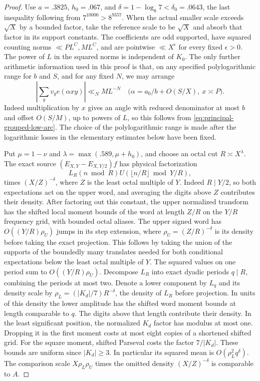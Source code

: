 \documentclass[11pt,a4paper]{article}
\theoremstyle{paperplain}
\numberwithin{equation}{section}
\begin{document}
\begin{proof}
Use $a=.3825$, $h_0=.067$, and $\delta=1-\log_8 7<\delta_0=.0643$,
the last inequality following from $7^{10000}>8^{9357}$.
When the actual smaller scale exceeds $\sqrt X$ by a bounded factor,
take the reference scale to be $\sqrt X$ and absorb that factor in its
support constants. The coefficients are odd supported, have squared
counting norms $\ll PL^C,ML^C$, and are pointwise $\ll X^\epsilon$ for
every fixed $\epsilon>0$. The power of $L$ in the squared norms is
independent of $K_0$. The only further arithmetic information used in
this proof is that, on any specified polylogarithmic range for $b$ and
$S$, and for any fixed $N$, we may arrange
\begin{equation}\label{eq:near-balanced-small-model-arc}
    \left|\sum_y v_y e(\alpha xy)\right|\ll_N M L^{-N}
   \quad\bigl(\alpha=a_0/b+O(S/X),\ x\asymp P\bigr).
\end{equation}
Indeed multiplication by $x$ gives an angle with reduced denominator
at most $b$ and offset $O(S/M)$, up to powers of $L$, so this follows
from \eqref{eq:principal-grouped-low-arc}. The choice of the
polylogarithmic range is made after the logarithmic losses in the
elementary estimates below have been fixed.

Put $\mu=1-\nu$ and $\lambda=\max(.589,\mu+h_0)$, and choose
an octal cut $R\asymp X^\lambda$. The exact source
$(E_{X,Y}-E_{X,Y/2})f$ has physical factorization
\begin{equation}\label{eq:near-balanced-source-factorization}
   L_R(n\bmod R) U(\lfloor n/R\rfloor\bmod Y/R),
\end{equation}
times $(X/Z)^{-\delta}$, where $Z$ is the least octal multiple of $Y$.
Indeed $R\mid Y/2$, so both expectations act on the upper word, and
averaging the digits above $Z$ contributes their density. After
factoring out this constant, the upper normalized transform has
the shifted local moment bounds of the word at length $Z/R$ on
the $Y/R$ frequency grid, with bounded octal aliases. The
upper signed word has $O((Y/R)\rho_U)$ jumps in its step
extension, where $\rho_U=(Z/R)^{-\delta}$ is its density before
taking the exact projection. This follows by taking the union of
the supports of the boundedly many translates needed for both
conditional expectations below the least octal multiple of $Y$.
The squared values on one period sum to $O((Y/R)\rho_U)$.
Decompose $L_R$ into exact dyadic periods $q\mid R$, combining
the periods at most two. Denote a lower component by $L_q$ and
its density scale by $\rho_L=(|K_d|/7)R^{-\delta}$, the density of
$L_R$ before projection. In units of this density the lower amplitude has the shifted word
moment bounds at length comparable to $q$. The digits above that
length contribute their density. In the least significant position,
the normalized $K_d$ factor has modulus at most one. Dropping it
in the first moment costs at most eight copies of a shortened
shifted grid. For the square moment, shifted Parseval costs the
factor $7/|K_d|$. These bounds are uniform since $|K_d|\ge3$.
In particular its squared mean is $O(\rho_L^2 q^\delta)$.
The comparison scale $X\rho_L\rho_U$ times the omitted density
$(X/Z)^{-\delta}$ is comparable to $A$.



\end{proof}
\end{document}

